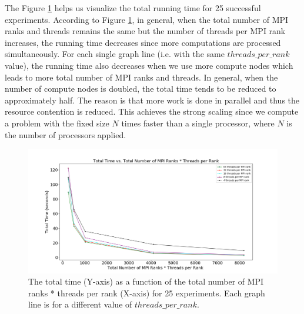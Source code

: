 \documentclass[conference]{IEEEtran}
\begin{document}
The Figure \ref{exec_time} helps us visualize the total running time for 25 successful experiments. According to Figure \ref{exec_time}, in general, when the total number of MPI ranks and threads remains the same but the number of threads per MPI rank increases, the running time decreases since more computations are processed simultaneously. For each single graph line (i.e. with the same $threads\_per\_rank$ value), the running time also decreases when we use more compute nodes which leads to more total number of MPI ranks and threads. In general, when the number of compute nodes is doubled, the total time tends to be reduced to approximately half. The reason is that more work is done in parallel and thus the resource contention is reduced. This achieves the strong scaling since we compute a problem with the fixed size $N$ times faster than a single processor, where $N$ is the number of processors applied.
\begin{figure}[!h]
    \centering
    \includegraphics[scale=0.25]{Figures/exec_algo1.png}
    \caption{The total time (Y-axis) as a function of the total number of MPI ranks * threads per rank (X-axis) for 25 experiments. Each graph line is for a different value of $threads\_per\_rank$.}
    \label{exec_time}
\end{figure}
\end{document}
